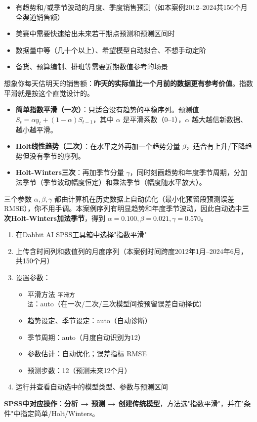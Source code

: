 \begin{algoscene}
\begin{itemize}
    \item 有趋势和/或季节波动的月度、季度销售预测（如本案例2012--2024共150个月全渠道销售额）
    \item 美赛中需要快速给出未来若干期点预测和预测区间时
    \item 数据量中等（几十个以上）、希望模型自动拟合、不想手动定阶
    \item 备货、预算编制、排班等需要近期数值参考的场景
\end{itemize}
\end{algoscene}

\begin{algoprinciple}
想象你每天估明天的销售额：\textbf{昨天的实际值比一个月前的数据更有参考价值}。指数平滑就是按这个直觉设计的。

\begin{itemize}
    \item \textbf{简单指数平滑（一次）}：只适合没有趋势的平稳序列。预测值 $S_t=\alpha y_t+(1-\alpha)S_{t-1}$，其中 $\alpha$ 是平滑系数（0--1），$\alpha$ 越大越信新数据、越小越平滑。
    \item \textbf{Holt线性趋势（二次）}：在水平之外再加一个趋势分量 $\beta$，适合有上升/下降趋势但没有季节的序列。
    \item \textbf{Holt-Winters三次}：再加季节分量 $\gamma$，同时刻画趋势和年度季节周期，分加法季节（季节波动幅度恒定）和乘法季节（幅度随水平放大）。
\end{itemize}

三个参数 $\alpha,\beta,\gamma$ 都由计算机在历史数据上自动优化（最小化预留段预测误差RMSE），你不用手调。本案例序列有明显趋势和年度季节波动，因此自动选中\textbf{三次Holt-Winters加法季节}，得到 $\alpha=0.100,\beta=0.021,\gamma=0.570$。
\end{algoprinciple}

\begin{algosposs}
\begin{enumerate}
    \item 在Dabbit AI SPSS工具箱中选择"指数平滑"
    \item 上传含时间列和数值列的月度序列（本案例时间跨度2012年1月--2024年6月，共150个月）
    \item 设置参数：
    \begin{itemize}
        \item 平滑方法 \texttt{平滑方法}：auto（在一次/二次/三次模型间按预留误差自动择优）
        \item 趋势设定、季节设定：auto（自动诊断）
        \item 季节周期：auto（月度自动识别为12）
        \item 参数估计：自动优化；误差指标 RMSE
        \item 预测步数：12（预测未来12个月）
    \end{itemize}
    \item 运行并查看自动选中的模型类型、参数与预测区间
\end{enumerate}

\textbf{SPSS中对应操作}：\textbf{分析 → 预测 → 创建传统模型}，方法选"指数平滑"，并在"条件"中指定简单/Holt/Winters。
\end{algosposs}

